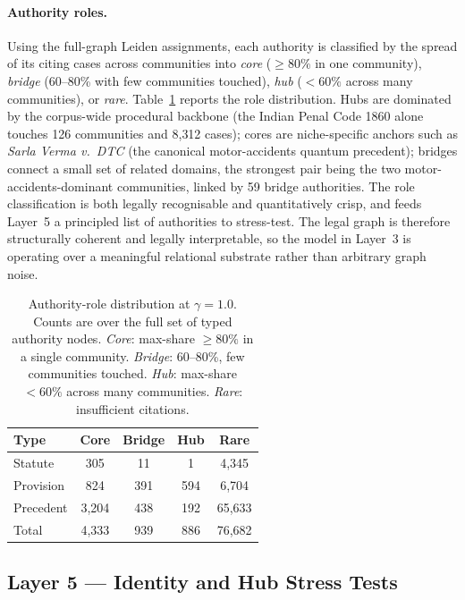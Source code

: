 \documentclass[runningheads]{llncs}
\begin{document}
\paragraph{Authority roles.} Using the full-graph Leiden assignments, each authority is classified by the spread of its citing cases across communities into \emph{core} ($\geq 80\%$ in one community), \emph{bridge} (60--80\% with few communities touched), \emph{hub} ($<60\%$ across many communities), or \emph{rare}. Table~\ref{tab:authority-roles} reports the role distribution. Hubs are dominated by the corpus-wide procedural backbone (the Indian Penal Code 1860 alone touches 126 communities and 8{,}312 cases); cores are niche-specific anchors such as \emph{Sarla Verma v.\ DTC} (the canonical motor-accidents quantum precedent); bridges connect a small set of related domains, the strongest pair being the two motor-accidents-dominant communities, linked by 59 bridge authorities. The role classification is both legally recognisable and quantitatively crisp, and feeds Layer~5 a principled list of authorities to stress-test. The legal graph is therefore structurally coherent and legally interpretable, so the model in Layer~3 is operating over a meaningful relational substrate rather than arbitrary graph noise.

\begin{table}[!t]
\centering
\caption{Authority-role distribution at $\gamma=1.0$. Counts are over the full set of typed authority nodes. \emph{Core}: max-share $\geq 80\%$ in a single community. \emph{Bridge}: 60--80\%, few communities touched. \emph{Hub}: max-share $<60\%$ across many communities. \emph{Rare}: insufficient citations.}
\label{tab:authority-roles}
\setlength{\tabcolsep}{6pt}
\renewcommand{\arraystretch}{1.15}
\small
\begin{tabular}{lcccc}
\toprule
Type & Core & Bridge & Hub & Rare \\
\midrule
Statute    & 305 & 11  & 1   & 4{,}345 \\
Provision  & 824 & 391 & 594 & 6{,}704 \\
Precedent  & 3{,}204 & 438 & 192 & 65{,}633 \\
\midrule
Total      & 4{,}333 & 939 & 886 & 76{,}682 \\
\bottomrule
\end{tabular}
\end{table}

\subsection{Layer 5 --- Identity and Hub Stress Tests}
\label{subsec:exp-robustness}
\end{document}
